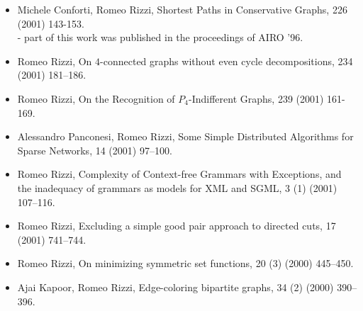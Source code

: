 \documentclass[10pt]{article}
\begin{document}
\begin{itemize}
  \vspace{1.4mm}
  \item {\sc Michele Conforti, Romeo Rizzi},  
   \newblock  Shortest Paths in Conservative Graphs,
    226 (2001) 143-153.
   \newblock \\ - part of this work
                  was published in the proceedings of AIRO '96.

  \vspace{1.4mm}
  \item {\sc Romeo Rizzi},
   \newblock  On $4$-connected graphs without even cycle decompositions,
    234 (2001) 181--186.

  \vspace{1.4mm}
  \item {\sc Romeo Rizzi},
   \newblock  On the Recognition of $P_4$-Indifferent Graphs,
    239 (2001) 161-169.

  \vspace{1.4mm}
  \item {\sc Alessandro Panconesi, Romeo Rizzi},
   \newblock  Some Simple Distributed Algorithms for Sparse Networks,
    14 (2001) 97--100.

  \vspace{1.4mm}
  \item {\sc Romeo Rizzi},
   \newblock  Complexity of Context-free Grammars with Exceptions,
              and the inadequacy of grammars as models for XML and SGML,
    3 (1) (2001) 107--116.

  \vspace{1.4mm}
  \item {\sc Romeo Rizzi},
   \newblock  Excluding a simple good pair approach to directed cuts,
    17 (2001) 741--744.

  \vspace{1.4mm}
  \item {\sc Romeo Rizzi},
   \newblock  On minimizing symmetric set functions,
    20 (3) (2000) 445--450.

  \vspace{1.4mm}
  \item {\sc Ajai Kapoor, Romeo Rizzi},
   \newblock  Edge-coloring bipartite graphs,
    34 (2) (2000) 390--396.


\end{itemize}
\end{document}
